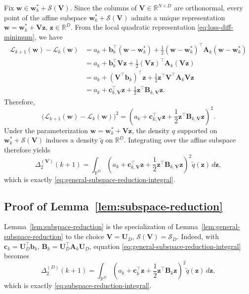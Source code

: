 \documentclass[10pt]{article}
\theoremstyle{plain}
\theoremstyle{remark}
\begin{document}
Fix $\mathbf w\in \mathbf w_k^*+\mathcal S(\mathbf V)$.
Since the columns of $\mathbf V\in\mathbb R^{N\times D}$ are orthonormal, every point of the affine subspace $\mathbf w_k^*+\mathcal S(\mathbf V)$ admits a unique representation $\mathbf w=\mathbf w_k^*+\mathbf V\mathbf z$, $\mathbf z\in\mathbb R^D$. From the local quadratic representation \eqref{eq:loss-diff-minimum}, we have
\begin{align*}
\mathcal L_{k+1}(\mathbf w)-\mathcal L_k(\mathbf w)
&=
a_k
+
\mathbf b_k^\top(\mathbf w-\mathbf w_k^*)
+
\frac12(\mathbf w-\mathbf w_k^*)^\top \mathbf A_k (\mathbf w-\mathbf w_k^*)
\\
&=
a_k
+
\mathbf b_k^\top \mathbf V\mathbf z
+
\frac12(\mathbf V\mathbf z)^\top \mathbf A_k (\mathbf V\mathbf z)
\\
&=
a_k
+
(\mathbf V^\top \mathbf b_k)^\top \mathbf z
+
\frac12 \mathbf z^\top \mathbf V^\top \mathbf A_k \mathbf V \mathbf z
\\
&=
a_k
+
\mathbf c_{k,\mathbf V}^\top \mathbf z
+
\frac12 \mathbf z^\top \mathbf B_{k,\mathbf V}\mathbf z.
\end{align*}
Therefore,
\[
\bigl(
\mathcal L_{k+1}(\mathbf w)-\mathcal L_k(\mathbf w)
\bigr)^2
=
\left(
a_k
+
\mathbf c_{k,\mathbf V}^\top \mathbf z
+
\frac12 \mathbf z^\top \mathbf B_{k,\mathbf V}\mathbf z
\right)^2.
\]
Under the parameterization $\mathbf w=\mathbf w_k^*+\mathbf V\mathbf z$, the density $q$ supported on $\mathbf w_k^*+\mathcal S(\mathbf V)$ induces a density $\tilde q$ on $\mathbb R^D$.
Integrating over the affine subspace therefore yields
\[
\Delta_2^{(\mathbf V)}(k+1)
=
\int_{\mathbb R^D}
\left(
a_k
+
\mathbf c_{k,\mathbf V}^\top \mathbf z
+
\frac12 \mathbf z^\top \mathbf B_{k,\mathbf V}\mathbf z
\right)^2
\tilde q(\mathbf z)\, d\mathbf z,
\]
which is exactly \eqref{eq:general-subspace-reduction-integral}.

\subsection{Proof of Lemma~\ref{lem:subspace-reduction}}

Lemma~\ref{lem:subspace-reduction} is the specialization of Lemma~\ref{lem:general-subspace-reduction} to the choice $\mathbf V=\mathbf U_D$, $\mathcal S(\mathbf V)=\mathcal S_D$. Indeed, with $\mathbf c_k=\mathbf U_D^\top \mathbf b_k$, $\mathbf B_k=\mathbf U_D^\top \mathbf A_k \mathbf U_D$, equation \eqref{eq:general-subspace-reduction-integral} becomes
\[
\Delta_2^{(D)}(k+1)
=
\int_{\mathbb R^D}
\left(
a_k+\mathbf c_k^\top \mathbf z+\frac12 \mathbf z^\top \mathbf B_k \mathbf z
\right)^2
\tilde q(\mathbf z)\, d\mathbf z,
\]
which is exactly \eqref{eq:subspace-reduction-integral}.
\end{document}
